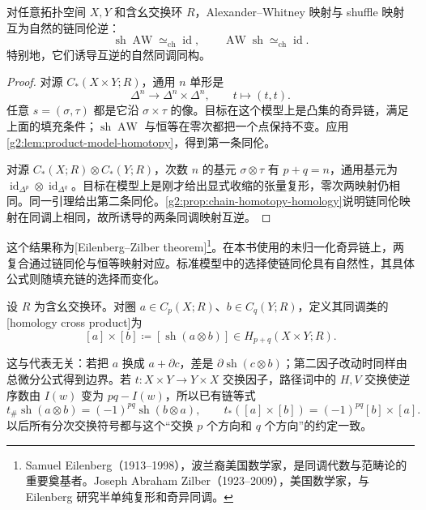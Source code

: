 \begin{theorem}\label{g2:thm:eilenberg-zilber}
	对任意拓扑空间 \(X,Y\) 和含幺交换环 \(R\)，Alexander--Whitney 映射与 shuffle 映射互为自然的链同伦逆：
	\[
		\operatorname{sh}\operatorname{AW}\simeq_{\mathrm{ch}}\operatorname{id},
		\qquad
		\operatorname{AW}\operatorname{sh}\simeq_{\mathrm{ch}}\operatorname{id}.
	\]
	特别地，它们诱导互逆的自然同调同构。
\end{theorem}
\begin{proof}
	对源 \(C_*(X\times Y;R)\)，通用 \(n\) 单形是
	\[
		\Delta^n\longrightarrow\Delta^n\times\Delta^n,\qquad t\longmapsto(t,t).
	\]
	任意 \(s=(\sigma,\tau)\) 都是它沿 \(\sigma\times\tau\) 的像。目标在这个模型上是凸集的奇异链，满足上面的填充条件；\(\operatorname{sh}\operatorname{AW}\) 与恒等在零次都把一个点保持不变。应用\cref{g2:lem:product-model-homotopy}，得到第一条同伦。

	对源 \(C_*(X;R)\otimes C_*(Y;R)\)，次数 \(n\) 的基元 \(\sigma\otimes\tau\) 有 \(p+q=n\)，通用基元为 \(\operatorname{id}_{\Delta^p}\otimes\operatorname{id}_{\Delta^q}\)。目标在模型上是刚才给出显式收缩的张量复形，零次两映射仍相同。同一引理给出第二条同伦。\cref{g2:prop:chain-homotopy-homology}说明链同伦映射在同调上相同，故所诱导的两条同调映射互逆。
\end{proof}

这个结果称为[Eilenberg--Zilber theorem]\footnote{Samuel Eilenberg（1913--1998），波兰裔美国数学家，是同调代数与范畴论的重要奠基者。Joseph Abraham Zilber（1923--2009），美国数学家，与 Eilenberg 研究半单纯复形和奇异同调。}。在本书使用的未归一化奇异链上，两复合通过链同伦与恒等映射对应。标准模型中的选择使链同伦具有自然性，其具体公式则随填充链的选择而变化。

\begin{definition}[同调外积]\label{g2:def:homology-cross-product}
	设 \(R\) 为含幺交换环。对圈 \(a\in C_p(X;R)\)、\(b\in C_q(Y;R)\)，定义其同调类的[homology cross product]为
	\[
		[a]\times[b]\coloneqq[\operatorname{sh}(a\otimes b)]
		\in H_{p+q}(X\times Y;R).
	\]
\end{definition}

这与代表无关：若把 \(a\) 换成 \(a+\partial c\)，差是 \(\partial\operatorname{sh}(c\otimes b)\)；第二因子改动时同样由总微分公式得到边界。若 \(t:X\times Y\to Y\times X\) 交换因子，路径词中的 \(H,V\) 交换使逆序数由 \(I(w)\) 变为 \(pq-I(w)\)，所以已有链等式
\begin{equation}\label{g2:eq:cross-product-switch}
	t_\#\operatorname{sh}(a\otimes b)
	=(-1)^{pq}\operatorname{sh}(b\otimes a),
	\qquad
	t_*([a]\times[b])=(-1)^{pq}[b]\times[a].
\end{equation}
以后所有分次交换符号都与这个“交换 \(p\) 个方向和 \(q\) 个方向”的约定一致。

